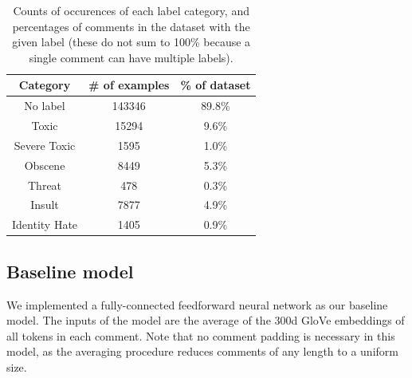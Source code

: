 \documentclass{article} %
\begin{document}
\begin{table}[ht]
\centering
\begin{tabular}{|c|c|c|}
\hline
Category & \# of examples & \% of dataset \\ \hline
No label & 143346 & 89.8\% \\
Toxic & 15294 & 9.6\% \\
Severe Toxic & 1595 & 1.0\% \\
Obscene & 8449 & 5.3\% \\
Threat & 478 & 0.3\% \\
Insult & 7877 & 4.9\% \\
Identity Hate & 1405 & 0.9\% \\
\hline
\end{tabular}
\caption{Counts of occurences of each label category, and percentages of comments in the dataset with the given label (these do not sum to 100\% because a single comment can have multiple labels).}
\label{tab:class_imb}
\end{table}

\subsection{Baseline model}

We implemented a fully-connected feedforward neural network as our baseline model. The inputs of the model are the average of the 300d GloVe embeddings of all tokens in each comment. Note that no comment padding is necessary in this model, as the averaging procedure reduces comments of any length to a uniform size.
\end{document}
